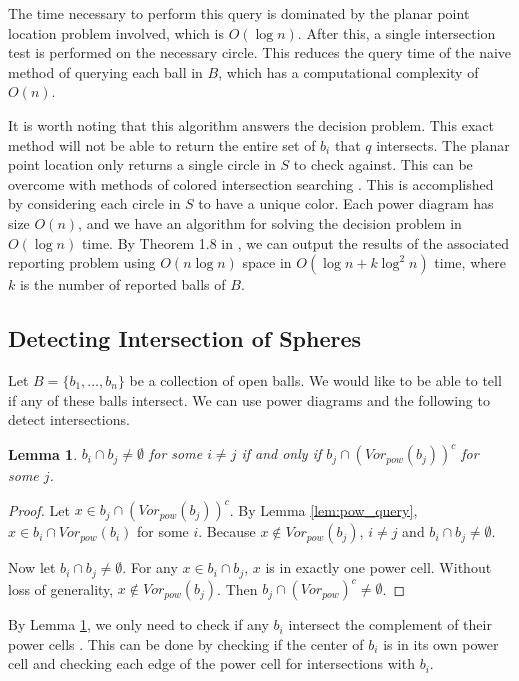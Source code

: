 \documentclass[a4paper, 11pt]{article}
\newtheorem{lemma}{Lemma}[section]
\begin{document}
The time necessary to perform this query is dominated by the planar point location problem involved, which is $O(\log n)$. After this, a single
intersection test is performed on the necessary circle. This reduces the query time of the naive method of querying each ball in $B$, which has a
computational complexity of $O(n)$.

It is worth noting that this algorithm answers the decision problem. This exact method will not be able to return the entire set of $b_i$ that $q$
intersects. The planar point location only returns a single circle in $S$ to check against. This can be overcome with methods of colored intersection
searching \cite{ravi}. This is accomplished by considering each circle in $S$ to have a unique color. Each power diagram has size $O(n)$, and we have
an algorithm for solving the decision problem in $O(\log n)$ time. By Theorem 1.8 in \cite{ravi}, we can output the results of the associated reporting problem using $O(n
\log n)$ space in $O(\log n +k \log^2 n)$ time, where $k$ is the number of reported balls of $B$.

\subsection{Detecting Intersection of Spheres}

Let $B = \{ b_1,\dots, b_n \}$ be a collection of open balls. We would like to be able to tell if any of these balls intersect. We can use power
diagrams and the following to detect intersections.

\begin{lemma}
  $b_i \cap b_j \neq \emptyset$ for some $i \neq j$ if and only if $b_j \cap (Vor_{pow}(b_j))^c$ for some $j$.
  \label{lem:ball_intersect}
\end{lemma}
\begin{proof}
  Let $x \in b_j \cap ( Vor_{pow}(b_j))^c$. By Lemma \ref{lem:pow_query}, $x \in b_i \cap Vor_{pow}(b_i)$ for some $i$. Because $x \not\in
  Vor_{pow}(b_j)$, $i \neq j$ and $b_i \cap b_j \neq \emptyset$.

  Now let $b_i \cap b_j \neq \emptyset$. For any $x \in b_i \cap b_j$, $x$ is in exactly one power cell. Without loss of generality, $x \not\in
  Vor_{pow}(b_j)$. Then $b_j \cap (Vor_{pow})^c \neq \emptyset$.
\end{proof}

By Lemma \ref{lem:ball_intersect}, we only need to check if any $b_i$ intersect the complement of their power cells \cite{aurenhammer_discs}. This can
be done by checking if the center of $b_i$ is in its own power cell and checking each edge of the power cell for intersections with $b_i$.
\end{document}
